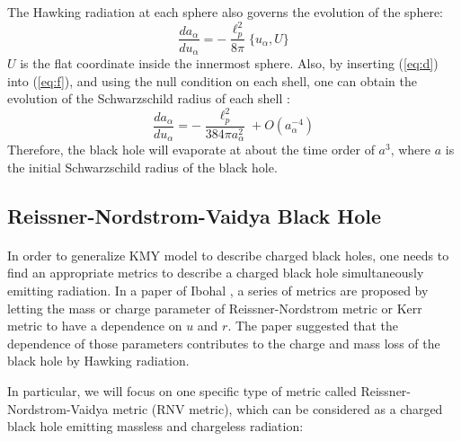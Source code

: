 \documentclass[letterpaper,12pt]{article}
\begin{document}
The Hawking radiation at each sphere also governs the evolution of the sphere:
\begin{equation}\label{eq:f}
\frac{da_{\alpha}}{du_{\alpha}} = -\frac{\ell_{p}^{2}}{8\pi}\{u_{\alpha},U\}
\end{equation}
$U$ is the flat coordinate inside the innermost sphere. Also, by inserting (\ref{eq:d}) into (\ref{eq:f}), and using the null condition on each shell, one can obtain the evolution of the Schwarzschild radius of each shell \cite{ho2015comment,kawai2013self} :
\begin{equation}
\frac{da_{\alpha}}{du_{\alpha}} =-\frac{\ell_{p}^{2}}{384\pi a_{\alpha}^2}+O(a_{\alpha}^{-4})
\end{equation}
Therefore, the black hole will evaporate at about the time order of $a^{3}$, where $a$ is the initial Schwarzschild radius of the black hole.

\subsection{Reissner-Nordstrom-Vaidya Black Hole} \label{sec:1-2}
\paragraph{ }
In order to generalize KMY model to describe charged black holes, one needs to find an appropriate metrics to describe a charged black hole simultaneously emitting radiation. In a paper of Ibohal \cite{boulware1976hawking,ibohal2002variably,ibohal2005rotating,ibohal2010charged,wang1999generalized}, a series of metrics are proposed by letting the mass or charge parameter of Reissner-Nordstrom metric or Kerr metric to have a dependence on $u$ and $r$. The paper suggested that the dependence of those parameters contributes to the charge and mass loss of the black hole by Hawking radiation.

In particular, we will focus on one specific type of metric called Reissner-Nordstrom-Vaidya metric (RNV metric), which can be considered as a charged black hole emitting massless and chargeless radiation:\cite{ ibohal2005rotating,ibohal2010charged}
\end{document}

